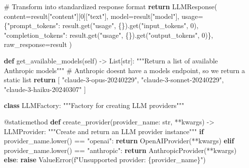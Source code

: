 \documentclass[
  11pt,
  letterpaper,
]{book}
\newenvironment{Shaded}{\begin{snugshade}}{\end{snugshade}}
\newcommand{\AttributeTok}[1]{\textcolor[rgb]{0.40,0.45,0.13}{#1}}
\newcommand{\BuiltInTok}[1]{\textcolor[rgb]{0.00,0.23,0.31}{#1}}
\newcommand{\CommentTok}[1]{\textcolor[rgb]{0.37,0.37,0.37}{#1}}
\newcommand{\ControlFlowTok}[1]{\textcolor[rgb]{0.00,0.23,0.31}{\textbf{#1}}}
\newcommand{\DecValTok}[1]{\textcolor[rgb]{0.68,0.00,0.00}{#1}}
\newcommand{\KeywordTok}[1]{\textcolor[rgb]{0.00,0.23,0.31}{\textbf{#1}}}
\newcommand{\NormalTok}[1]{\textcolor[rgb]{0.00,0.23,0.31}{#1}}
\newcommand{\OperatorTok}[1]{\textcolor[rgb]{0.37,0.37,0.37}{#1}}
\newcommand{\PreprocessorTok}[1]{\textcolor[rgb]{0.68,0.00,0.00}{#1}}
\newcommand{\SpecialCharTok}[1]{\textcolor[rgb]{0.37,0.37,0.37}{#1}}
\newcommand{\SpecialStringTok}[1]{\textcolor[rgb]{0.13,0.47,0.30}{#1}}
\newcommand{\StringTok}[1]{\textcolor[rgb]{0.13,0.47,0.30}{#1}}
\newcommand{\VariableTok}[1]{\textcolor[rgb]{0.07,0.07,0.07}{#1}}
\begin{document}
\begin{Shaded}
\begin{Highlighting}[]
        \CommentTok{\# Transform into standardized response format}
        \ControlFlowTok{return}\NormalTok{ LLMResponse(}
\NormalTok{            content}\OperatorTok{=}\NormalTok{result[}\StringTok{"content"}\NormalTok{][}\DecValTok{0}\NormalTok{][}\StringTok{"text"}\NormalTok{],}
\NormalTok{            model}\OperatorTok{=}\NormalTok{result[}\StringTok{"model"}\NormalTok{],}
\NormalTok{            usage}\OperatorTok{=}\NormalTok{\{}\StringTok{"prompt\_tokens"}\NormalTok{: result.get(}\StringTok{"usage"}\NormalTok{, \{\}).get(}\StringTok{"input\_tokens"}\NormalTok{, }\DecValTok{0}\NormalTok{),}
                   \StringTok{"completion\_tokens"}\NormalTok{: result.get(}\StringTok{"usage"}\NormalTok{, \{\}).get(}\StringTok{"output\_tokens"}\NormalTok{, }\DecValTok{0}\NormalTok{)\},}
\NormalTok{            raw\_response}\OperatorTok{=}\NormalTok{result}
\NormalTok{        )}

    \KeywordTok{def}\NormalTok{ get\_available\_models(}\VariableTok{self}\NormalTok{) }\OperatorTok{{-}\textgreater{}}\NormalTok{ List[}\BuiltInTok{str}\NormalTok{]:}
        \CommentTok{"""Return a list of available Anthropic models"""}
        \CommentTok{\# Anthropic doesn\textquotesingle{}t have a models endpoint, so we return a static list}
        \ControlFlowTok{return}\NormalTok{ [}
            \StringTok{"claude{-}3{-}opus{-}20240229"}\NormalTok{,}
            \StringTok{"claude{-}3{-}sonnet{-}20240229"}\NormalTok{,}
            \StringTok{"claude{-}3{-}haiku{-}20240307"}
\NormalTok{        ]}

\KeywordTok{class}\NormalTok{ LLMFactory:}
    \CommentTok{"""Factory for creating LLM providers"""}

    \AttributeTok{@staticmethod}
    \KeywordTok{def}\NormalTok{ create\_provider(provider\_name: }\BuiltInTok{str}\NormalTok{, }\OperatorTok{**}\NormalTok{kwargs) }\OperatorTok{{-}\textgreater{}}\NormalTok{ LLMProvider:}
        \CommentTok{"""Create and return an LLM provider instance"""}
        \ControlFlowTok{if}\NormalTok{ provider\_name.lower() }\OperatorTok{==} \StringTok{"openai"}\NormalTok{:}
            \ControlFlowTok{return}\NormalTok{ OpenAIProvider(}\OperatorTok{**}\NormalTok{kwargs)}
        \ControlFlowTok{elif}\NormalTok{ provider\_name.lower() }\OperatorTok{==} \StringTok{"anthropic"}\NormalTok{:}
            \ControlFlowTok{return}\NormalTok{ AnthropicProvider(}\OperatorTok{**}\NormalTok{kwargs)}
        \ControlFlowTok{else}\NormalTok{:}
            \ControlFlowTok{raise} \PreprocessorTok{ValueError}\NormalTok{(}\SpecialStringTok{f"Unsupported provider: }\SpecialCharTok{\{}\NormalTok{provider\_name}\SpecialCharTok{\}}\SpecialStringTok{"}\NormalTok{)}
\end{Highlighting}
\end{Shaded}
\end{document}
